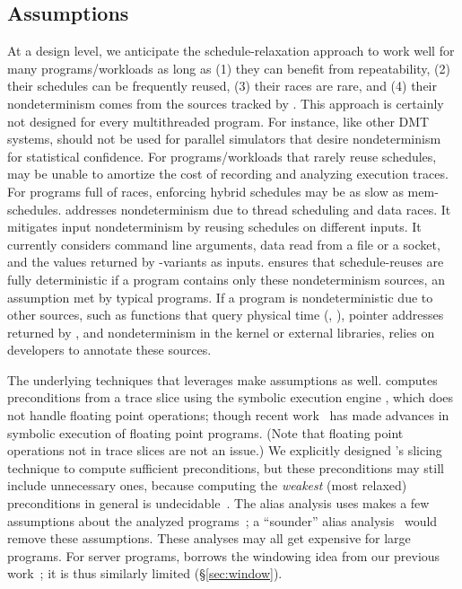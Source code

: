 \subsection{Assumptions} \label{sec:limitations}

At a design level, we anticipate the schedule-relaxation approach to work
well for many programs/workloads as long as (1) they can benefit from
repeatability, (2) their schedules can be frequently reused, (3) their
races are rare, and (4) their nondeterminism comes from the sources
tracked by \peregrine.  This approach is certainly not designed for every
multithreaded program. For instance, like other DMT systems, \peregrine should
not be used for parallel simulators that desire nondeterminism for
statistical confidence.  For programs/workloads that rarely reuse
schedules, \peregrine may be unable to amortize the cost of recording and
analyzing execution traces.  For programs full of races, enforcing hybrid
schedules may be as slow as mem-schedules.  \peregrine addresses nondeterminism
due to thread scheduling and data races.  It mitigates input
nondeterminism by reusing schedules on different inputs.  It currently
considers command line arguments, data read from a file or a socket, and
the values returned by -variants as inputs.  \peregrine ensures that
schedule-reuses are fully deterministic if a program contains only these
nondeterminism sources, an assumption met by typical programs.  If a
program is nondeterministic due to other sources, such as functions that
query physical time (\eg, ), pointer addresses returned
by , and nondeterminism in the kernel or external libraries,
\peregrine relies on developers to annotate these sources.


The underlying techniques that \peregrine leverages make assumptions as well.
\peregrine computes preconditions from a trace slice using the symbolic
execution engine \klee, which does not handle floating point operations;
though recent work~\cite{klee-fp} has made advances in symbolic execution
of floating point programs.  (Note
that floating point operations not in trace slices are not an issue.)  We
explicitly designed \peregrine's slicing technique to compute sufficient
preconditions, but these preconditions may still include unnecessary ones,
because computing the \emph{weakest} (most relaxed) preconditions in general is
undecidable~\cite{aho:dragon:06}.  The alias analysis \peregrine uses makes a
few assumptions about the analyzed programs~\cite{alias:icse05};
a ``sounder'' alias analysis~\cite{alias:fse06} would remove these
assumptions.  These analyses may all get expensive for large
programs.  For server programs, \peregrine borrows the
windowing idea from our previous work~\cite{cui:tern:osdi10}; it is thus
similarly limited (\S\ref{sec:window}).

